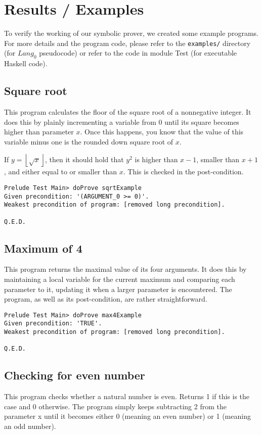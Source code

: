 \documentclass[a4paper]{article}
\newcommand{\floor}[1]{\left\lfloor #1 \right\rfloor}
\begin{document}
\section{Results / Examples}
To verify the working of our symbolic prover, we created some example programs. For more details and the program code, please refer to the \texttt{examples/} directory (for $\mathit{Lang}_0$ pseudocode) or refer to the code in module \textsf{Test} (for executable Haskell code).

\subsection{Square root}
This program calculates the floor of the square root of a nonnegative integer. It does this by plainly incrementing a variable from 0 until its square becomes higher than parameter $x$. Once this happens, you know that the value of this variable minus one is the rounded down square root of $x$.

If $y = \floor{\sqrt{x}}$, then it should hold that $y^2$ is higher than $x - 1$, smaller than $x + 1$, and either equal to or smaller than $x$. This is checked in the post-condition.

\begin{verbatim}
Prelude Test Main> doProve sqrtExample 
Given precondition: '(ARGUMENT_0 >= 0)'.
Weakest precondition of program: [removed long precondition].

Q.E.D.
\end{verbatim}

\subsection{Maximum of 4}
This program returns the maximal value of its four arguments. It does this by maintaining a local variable for the current maximum and comparing each parameter to it, updating it when a larger parameter is encountered. The program, as well as its post-condition, are rather straightforward.

\begin{verbatim}
Prelude Test Main> doProve max4Example 
Given precondition: 'TRUE'.
Weakest precondition of program: [removed long precondition].

Q.E.D.
\end{verbatim}

\subsection{Checking for even number}
This program checks whether a natural number is even. Returns 1 if this is the case and 0 otherwise. The program simply keeps subtracting 2 from the parameter x until it becomes either 0 (meaning an even number) or 1 (meaning an odd number).
\end{document}
